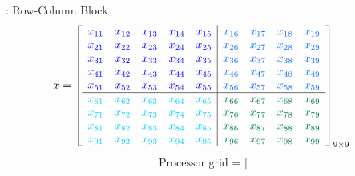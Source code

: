 \begin{frame}
  \begin{exampleblock}{: Row-Column Block}
    \begin{align*}
      x &= \left[
          \begin{array}{lllll|llll}
      \color{g11}x_{11} & \color{g11}x_{12} & \color{g11}x_{13} &
\color{g11}x_{14} & \color{g11}x_{15} & \color{g12}x_{16} & \color{g12}x_{17} &
\color{g12}x_{18} & \color{g12}x_{19}\\
      \color{g11}x_{21} & \color{g11}x_{22} & \color{g11}x_{23} &
\color{g11}x_{24} & \color{g11}x_{25} & \color{g12}x_{26} & \color{g12}x_{27} &
\color{g12}x_{28} & \color{g12}x_{29}\\
      \color{g11}x_{31} & \color{g11}x_{32} & \color{g11}x_{33} &
\color{g11}x_{34} & \color{g11}x_{35} & \color{g12}x_{36} & \color{g12}x_{37} &
\color{g12}x_{38} & \color{g12}x_{39}\\
      \color{g11}x_{41} & \color{g11}x_{42} & \color{g11}x_{43} &
\color{g11}x_{44} & \color{g11}x_{45} & \color{g12}x_{46} & \color{g12}x_{47} &
\color{g12}x_{48} & \color{g12}x_{49}\\
      \color{g11}x_{51} & \color{g11}x_{52} & \color{g11}x_{53} &
\color{g11}x_{54} & \color{g11}x_{55} & \color{g12}x_{56} & \color{g12}x_{57} &
\color{g12}x_{58} & \color{g12}x_{59}\\\hline
      \color{g13}x_{61} & \color{g13}x_{62} & \color{g13}x_{63} &
\color{g13}x_{64} & \color{g13}x_{65} & \color{g21}x_{66} & \color{g21}x_{67} &
\color{g21}x_{68} & \color{g21}x_{69}\\
      \color{g13}x_{71} & \color{g13}x_{72} & \color{g13}x_{73} &
\color{g13}x_{74} & \color{g13}x_{75} & \color{g21}x_{76} & \color{g21}x_{77} &
\color{g21}x_{78} & \color{g21}x_{79}\\
      \color{g13}x_{81} & \color{g13}x_{82} & \color{g13}x_{83} &
\color{g13}x_{84} & \color{g13}x_{85} & \color{g21}x_{86} & \color{g21}x_{87} &
\color{g21}x_{88} & \color{g21}x_{89}\\
      \color{g13}x_{91} & \color{g13}x_{92} & \color{g13}x_{93} &
\color{g13}x_{94} & \color{g13}x_{95} & \color{g21}x_{96} & \color{g21}x_{97} &
\color{g21}x_{98} & \color{g21}x_{99}\\
          \end{array}
      \right]_{9\times 9}
    \end{align*}
    \begin{align*}
      \text{Processor grid = }
      \left|
      \begin{array}{ll}

\end{array}
\end{align*}
\end{exampleblock}
\end{frame}
